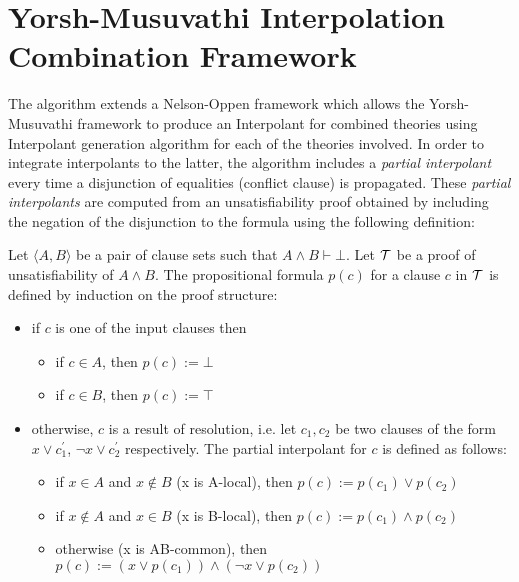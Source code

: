 \section{Yorsh-Musuvathi Interpolation Combination Framework}

The algorithm extends a Nelson-Oppen framework which allows the Yorsh-Musuvathi
framework to produce an Interpolant
for combined theories using Interpolant
generation algorithm for each of the 
theories involved. 
In order to 
integrate interpolants to the latter, 
the algorithm includes a 
\emph{partial interpolant} every time a disjunction of equalities 
(conflict clause) is propagated. These \emph{partial interpolants} are 
computed from an unsatisfiability proof obtained by including the 
negation of the disjunction to the formula using the following
definition: 

\begin{definition} \cite{10.1007/11532231_26}
  Let $\langle A, B \rangle$ be a pair of clause sets such
  that $A \land B \vdash \bot$. Let $\cal{T}$ be a proof of
  unsatisfiability of $A \land B$. The propositional 
  formula $p(c)$ for a clause $c$ in $\cal{T}$ is defined
  by induction on the proof structure:
  \begin{itemize}
    \item if $c$ is one of the input clauses then
      \begin{itemize}
        \item if $c \in A$, then $p(c) := \bot$
        \item if $c \in B$, then $p(c) := \top$
      \end{itemize}
    \item otherwise, $c$ is a result of resolution, i.e. 
      let $c_1, c_2$ be two clauses of the form $x \lor c_1^{'}$,
      $\neg x \lor c_2^{'}$ respectively. The partial interpolant 
      for $c$ is defined as follows:
      \begin{itemize}
        \item if $x \in A$ and $x \not \in B$ (x is A-local), then $p(c) := p(c_1) \lor p(c_2)$
        \item if $x \not \in A$ and $x \in B$ (x is B-local), then $p(c) := p(c_1) \land p(c_2)$
        \item otherwise (x is AB-common), then $p(c) := (x \lor p(c_1)) \land (\neg x \lor p(c_2))$
      \end{itemize}
  \end{itemize}
\end{definition}

